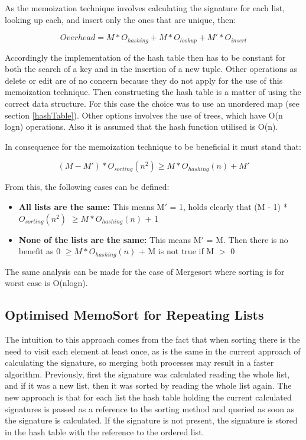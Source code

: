 \documentclass[a4paper,12pt]{article}
\begin{document}
As the memoization technique involves calculating the signature for each list, looking up each, and insert only the ones that are unique, then:

\begin{equation}
Overhead =  M * O_{hashing} + M * O_{lookup} + M' * O_{insert}
\end{equation}

Accordingly the implementation of the hash table then has to be constant for both the search of a key and in the insertion of a new tuple. Other operations as delete or edit are of no concern because they do not apply for the use of this memoization technique. Then constructing the hash table is a matter of using the correct data structure. For this case the choice was to use an unordered map (see  section \ref{hashTable}). Other options involves the use of trees, which have O(n logn) operations. Also it is assumed that the hash function utilised is O(n). 

In consequence for the memoization technique to be beneficial it must stand that:

\begin{equation}
(M - M') *  O_{sorting}(n^2) \geq M * O_{hashing}(n)+ M'
\end{equation}

From this, the following cases can be defined:
\begin{itemize}
\item {\bf All lists are the same:}  This means M$'$ = 1, holds clearly that (M - 1) *   $O_{sorting}(n^2)$   $\geq M *O_{hashing}(n)$ + 1
\item {\bf None of the lists are the same:} This means M$'$ = M. Then there is no benefit as 0 $ \geq M * O_{hashing}(n)$ + M is not true if M $>$ 0
\end{itemize}

The same analysis can be made for the case of Mergesort where sorting is for worst case is O(nlogn). \\

\subsection{Optimised MemoSort for Repeating Lists} \label{OptMemoSort}
The intuition to this approach comes from the fact that when sorting there is the need to visit each element at least once, as is the same in the current approach of calculating the signature, so merging both processes may result in a faster algorithm. Previously, first the signature was calculated reading the whole list, and if it was a new list, then it was sorted by reading the whole list again.
The new approach is that for each list the hash table holding the current calculated signatures is passed as a reference to the sorting method and queried as soon as the signature is calculated. If the signature is not present, the signature is stored in the hash table with the reference to the ordered list. \\
\end{document}

